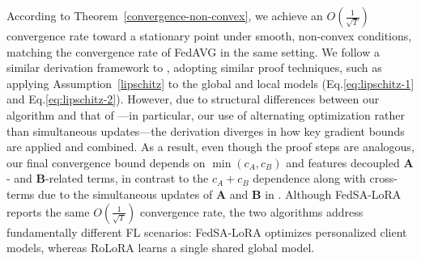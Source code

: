 According to Theorem~\ref{convergence-non-convex}, we achieve an $O\left(\frac{1}{\sqrt{T}}\right)$ convergence rate toward a stationary point under smooth, non-convex conditions, matching the convergence rate of FedAVG in the same setting. We follow a similar derivation framework to \cite{guo2025selective}, adopting similar proof techniques, such as applying Assumption~\ref{lipschitz} to the global and local models (Eq.\eqref{eq:lipschitz-1} and Eq.\eqref{eq:lipschitz-2}). However, due to structural differences between our algorithm and that of \cite{guo2025selective}—in particular, our use of alternating optimization rather than simultaneous updates—the derivation diverges in how key gradient bounds are applied and combined. As a result, even though the proof steps are analogous, our final convergence bound depends on $\min(c_A, c_B)$ and features decoupled $\mathbf{A}$- and $\mathbf{B}$-related terms, in contrast to the $c_A + c_B$ dependence along with cross-terms due to the simultaneous updates of $\mathbf{A}$ and $\mathbf{B}$ in \cite{guo2025selective}. Although FedSA-LoRA reports the same $O\left(\frac{1}{\sqrt{T}}\right)$ convergence rate, the two algorithms address fundamentally different FL scenarios: FedSA-LoRA optimizes personalized client models, whereas RoLoRA learns a single shared global model.


